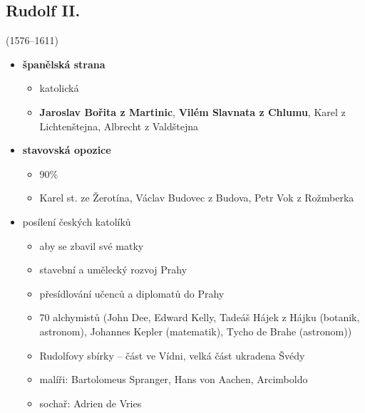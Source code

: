 \subsection{Rudolf II.}(1576--1611)
\begin{itemize}
\item \textbf{španělská strana}
	\begin{itemize}
	\item katolická
	\item \textbf{Jaroslav Bořita z Martinic}, \textbf{Vilém Slavnata z Chlumu}, Karel z Lichtenštejna, Albrecht z Valdštejna 
	\end{itemize}
\item \textbf{stavovská opozice}
	\begin{itemize}
	\item 90\%
	\item Karel st. ze Žerotína, Václav Budovec z Budova, Petr Vok z Rožmberka
	\end{itemize}
\item {} \ra posílení českých katolíků 
	\begin{itemize}
	\item aby se zbavil své matky
	\item stavební a umělecký rozvoj Prahy
	\item přesídlování učenců a diplomatů do Prahy
	\item 70 alchymistů (John Dee, Edward Kelly, Tadeáš Hájek z Hájku (botanik, astronom), Johannes Kepler (matematik), Tycho de Brahe (astronom))
	\item Rudolfovy sbírky -- část ve Vídni, velká část ukradena Švédy 
	\item malíři: Bartolomeus Spranger, Hans von Aachen, Arcimboldo
	\item sochař: Adrien de Vries
	\end{itemize}
\end{itemize}


